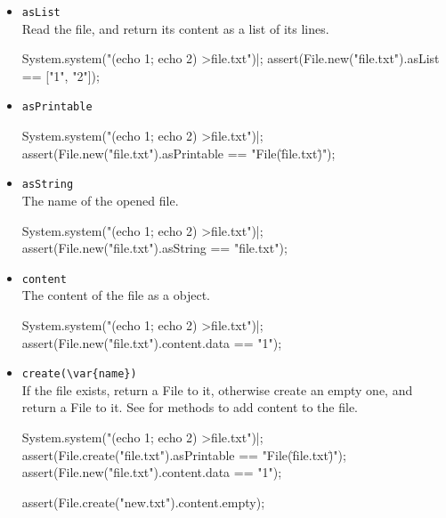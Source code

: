 \begin{itemize}
\item \lstinline|asList|\\
  Read the file, and return its content as a list of its lines.
\begin{urbiscript}[firstnumber=last]
System.system("(echo 1; echo 2) >file.txt")|;
assert(File.new("file.txt").asList == ["1", "2"]);
\end{urbiscript}

\item \lstinline|asPrintable|\\
\begin{urbiscript}[firstnumber=last]
System.system("(echo 1; echo 2) >file.txt")|;
assert(File.new("file.txt").asPrintable == "File(\"file.txt\")");
\end{urbiscript}


\item \lstinline|asString|\\
  The name of the opened file.
\begin{urbiscript}[firstnumber=last]
System.system("(echo 1; echo 2) >file.txt")|;
assert(File.new("file.txt").asString == "file.txt");
\end{urbiscript}

\item \lstinline|content|\\
  The content of the file as a  object.
\begin{urbiscript}[firstnumber=last]
System.system("(echo 1; echo 2) >file.txt")|;
assert(File.new("file.txt").content.data == "1\n");
\end{urbiscript}

\item \lstinline|create(\var{name})|\\
  If the file  exists, return a File to it, otherwise create
  an empty one, and return a File to it.  See 
  for methods to add content to the file.
\begin{urbiscript}[firstnumber=last]
System.system("(echo 1; echo 2) >file.txt")|;
assert(File.create("file.txt").asPrintable == "File(\"file.txt\")");
assert(File.new("file.txt").content.data == "1\n");

assert(File.create("new.txt").content.empty);
\end{urbiscript}
\end{itemize}


